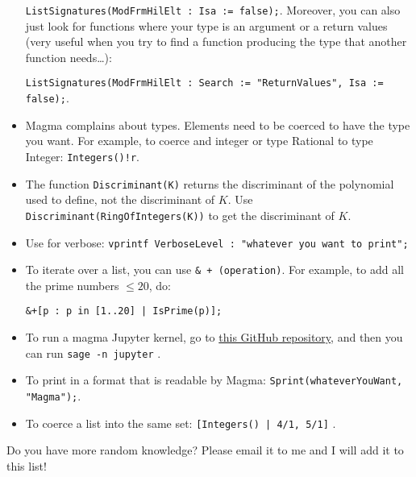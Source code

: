 \documentclass[12pt]{article}
\begin{document}
\begin{itemize}
\verb|ListSignatures(ModFrmHilElt : Isa := false);|.  Moreover, you can also just look for functions where your type is an argument or a return values (very useful when you try to find a function producing the type that another function needs…):

\verb|ListSignatures(ModFrmHilElt : Search := "ReturnValues", Isa := false);|.

\item \textsf{Magma} complains about types.  Elements need to be coerced to have the type you want. For example, to coerce and integer or type Rational  to type Integer: \verb|Integers()!r|.

\item The function \verb|Discriminant(K)| returns the discriminant of the polynomial used to define, not the discriminant of $K$. Use \verb|Discriminant(RingOfIntegers(K))| to get the discriminant of $K$.

\item Use for verbose: \verb|vprintf VerboseLevel : "whatever you want to print";|

\item To iterate over a list, you can use \verb|& + (operation)|.  For example, to add all the prime numbers $\le 20$, do: \begin{verbatim}&+[p : p in [1..20] | IsPrime(p)];\end{verbatim}

\item To run a magma Jupyter kernel, go to \href{https://github.com/edgarcosta/magma_kernel}{this GitHub repository}, and then you can run \verb|sage -n jupyter| .

\item To print in a format that is readable by \textsf{Magma}: \verb|Sprint(whateverYouWant, "Magma");|.

\item To coerce a list into the same set: 
\verb+[Integers() | 4/1, 5/1]+ .
\end{itemize}
Do you have more random knowledge? Please email it to me and I will add it to this list!
\end{document}
